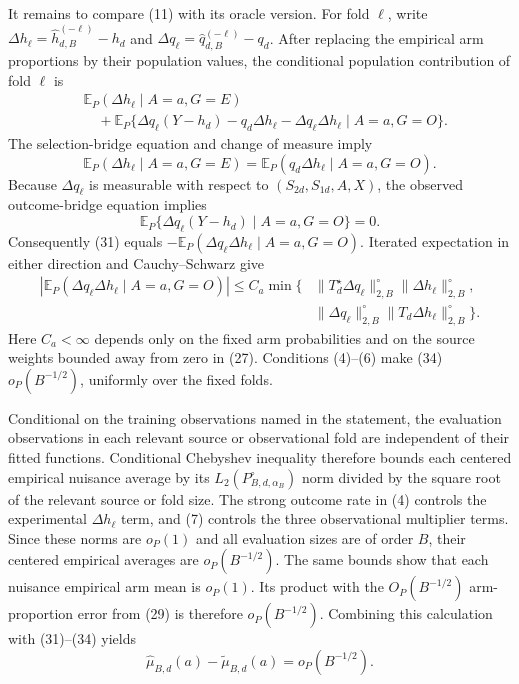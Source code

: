 It remains to compare (11) with its oracle version.  For fold \(\ell\), write \(\Delta h_\ell=\widehat h_{d,B}^{(-\ell)}-h_d\) and \(\Delta q_\ell=\widehat q_{d,B}^{(-\ell)}-q_d\).  After replacing the empirical arm proportions by their population values, the conditional population contribution of fold \(\ell\) is
\[
\begin{aligned}
 &\mathbb E_P(\Delta h_\ell\mid A=a,G=E)\\
 &\quad+\mathbb E_P\{\Delta q_\ell(Y-h_d)-q_d\Delta h_\ell
                -\Delta q_\ell\Delta h_\ell\mid A=a,G=O\}.
\end{aligned}                                                \tag{31}
\]
The selection-bridge equation and change of measure imply
\[
 \mathbb E_P(\Delta h_\ell\mid A=a,G=E)
 =\mathbb E_P(q_d\Delta h_\ell\mid A=a,G=O).                \tag{32}
\]
Because \(\Delta q_\ell\) is measurable with respect to \((S_{2d},S_{1d},A,X)\), the observed outcome-bridge equation implies
\[
 \mathbb E_P\{\Delta q_\ell(Y-h_d)\mid A=a,G=O\}=0.         \tag{33}
\]
Consequently (31) equals \(-\mathbb E_P(\Delta q_\ell\Delta h_\ell\mid A=a,G=O)\).  Iterated expectation in either direction and Cauchy--Schwarz give
\[
\begin{aligned}
 |\mathbb E_P(\Delta q_\ell\Delta h_\ell\mid A=a,G=O)|
 \le C_a\min\{&
 \|T_d^\star\Delta q_\ell\|_{2,B}^{\circ}
 \|\Delta h_\ell\|_{2,B}^{\circ},\\
 &\|\Delta q_\ell\|_{2,B}^{\circ}
 \|T_d\Delta h_\ell\|_{2,B}^{\circ}\}.
\end{aligned}                                                \tag{34}
\]
Here \(C_a<\infty\) depends only on the fixed arm probabilities and on the source weights bounded away from zero in (27).  Conditions (4)--(6) make (34) \(o_P(B^{-1/2})\), uniformly over the fixed folds.

Conditional on the training observations named in the statement, the evaluation observations in each relevant source or observational fold are independent of their fitted functions.  Conditional Chebyshev inequality therefore bounds each centered empirical nuisance average by its \(L_2(P_{B,d,\alpha_B}^{\circ})\) norm divided by the square root of the relevant source or fold size.  The strong outcome rate in (4) controls the experimental \(\Delta h_\ell\) term, and (7) controls the three observational multiplier terms.  Since these norms are \(o_P(1)\) and all evaluation sizes are of order \(B\), their centered empirical averages are \(o_P(B^{-1/2})\).  The same bounds show that each nuisance empirical arm mean is \(o_P(1)\).  Its product with the \(O_P(B^{-1/2})\) arm-proportion error from (29) is therefore \(o_P(B^{-1/2})\).  Combining this calculation with (31)--(34) yields
\[
 \widehat\mu_{B,d}(a)-\widetilde\mu_{B,d}(a)=o_P(B^{-1/2}). \tag{35}
\]

